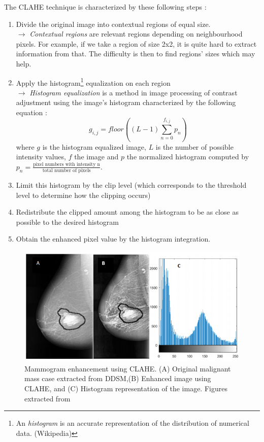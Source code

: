 \documentclass[11pt, openany]{report}
\theoremstyle{plain}
\theoremstyle{definition}
\theoremstyle{remark}
\begin{document}
The CLAHE technique is characterized by these following steps \cite{breast-cancer}: 
\begin{enumerate}
\item Divide the original image into contextual regions of equal size. \\
	  $\rightarrow$ \textit{Contextual regions} are relevant regions depending on neighbourhood pixels. For example, if we take a region of size 2x2, it is quite hard to extract information from that. The difficulty is then to find regions' sizes which may help.   

\newpage	  
\item Apply the histogram\footnote{An \textit{histogram} is an accurate representation of the distribution of numerical data. (Wikipedia)} equalization on each region \\ 
	  $\rightarrow$ \textit{Histogram equalization} is a method in image processing of contrast adjustment using the image's histogram characterized by the following equation \cite{book-digital-processing}: 
	  $$ g_{i,j} = floor((L-1) \sum_{n=0}^{f_{i,j}} p_{n}) $$ where $g$ is the histogram equalized image, $L$ is the number of possible intensity values, $f$ the image and $p$ the normalized histogram computed by $p_{n} = \frac{\text{pixel numbers with intensity n}}{\text{total number of pixels}}$. 
	  
\item Limit this histogram by the clip level (which corresponds to the threshold level to determine how the clipping occurs) 

\item Redistribute the clipped amount among the histogram to be as close as possible to the desired histogram

\item Obtain the enhanced pixel value by the histogram integration. 
\end{enumerate}

\begin{figure}[h]
  \centering
  \includegraphics[scale=0.55]{figures/CLAHE.png}
  \caption{Mammogram enhancement using CLAHE. (A) Original malignant mass case extracted from DDSM,(B) Enhanced image using CLAHE, and (C) Histogram representation of the image. Figures extracted from \cite{breast-cancer}}
  \label{fig:CLAHE}
\end{figure}
\end{document}
